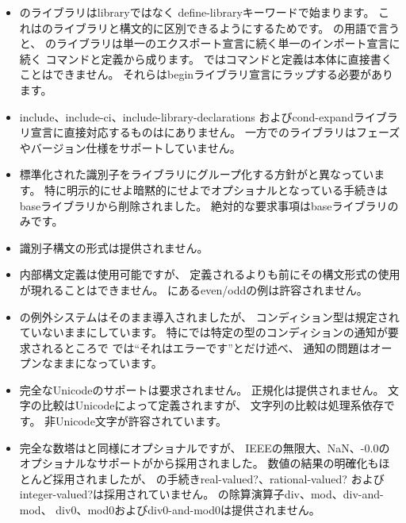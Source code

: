 \begin{itemize}
\item \rsevenrs{}のライブラリは{\cf library}ではなく
{\cf define-\+library}キーワードで始まります。
これは\rsixrs{}のライブラリと構文的に区別できるようにするためです。
\rsevenrs{}の用語で言うと、
\rsixrs{}のライブラリは単一のエクスポート宣言に続く単一のインポート宣言に続く
コマンドと定義から成ります。
\rsevenrs{}ではコマンドと定義は本体に直接書くことはできません。
それらは{\cf begin}ライブラリ宣言にラップする必要があります。

\item {\cf include}、{\cf include-\+ci}、{\cf include-\+library-\+dec\-la\-ra\-tions}
および{\cf cond-\+expand}ライブラリ宣言に直接対応するものは\rsixrs{}にありません。
一方で\rsevenrs{}のライブラリはフェーズやバージョン仕様をサポートしていません。

\item 標準化された識別子をライブラリにグループ化する方針が\rsixrs{}と異なっています。
特に明示的にせよ暗黙的にせよ\rfivers{}でオプショナルとなっている手続きは
baseライブラリから削除されました。
絶対的な要求事項はbaseライブラリのみです。

\item 識別子構文の形式は提供されません。

\item 内部構文定義は使用可能ですが、
定義されるよりも前にその構文形式の使用が現れることはできません。
\rsixrs{}にある{\cf even}/{\cf odd}の例は許容されません。

\item \rsixrs{}の例外システムはそのまま導入されましたが、
コンディション型は規定されていないままにしています。
特に\rsixrs{}では特定の型のコンディションの通知が要求されるところで
\rsevenrs{}では``それはエラーです''とだけ述べ、
通知の問題はオープンなままになっています。

\item 完全なUnicodeのサポートは要求されません。
正規化は提供されません。
文字の比較はUnicodeによって定義されますが、
文字列の比較は処理系依存です。
非Unicode文字が許容されています。

\item 完全な数塔は\rfivers{}と同様にオプショナルですが、
IEEEの無限大、NaN、{\mbox -0.0}のオプショナルなサポートが\rsixrs{}から採用されました。
数値の結果の明確化もほとんど採用されましたが、
\rsixrs{}の手続き{\cf real-valued?}、{\cf rational-valued?}
および{\cf integer-valued?}は採用されていません。
\rsixrs{}の除算演算子{\cf div}、{\cf mod}、{\cf div-and-mod}、
{\cf div0}、{\cf mod0}および{\cf div0-and-mod0}は提供されません。


\end{itemize}
